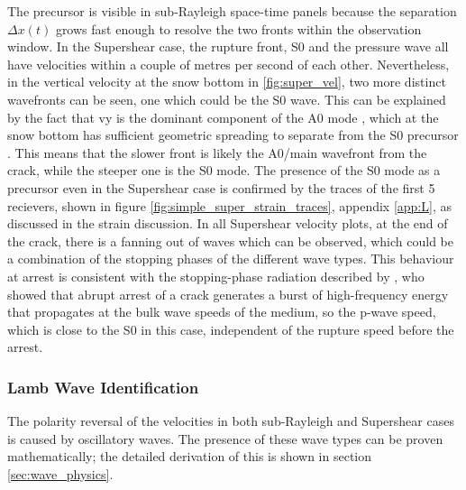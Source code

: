 The precursor is visible in sub-Rayleigh space-time panels because the separation $\Delta x(t)$ grows fast enough to resolve the two fronts within the observation window. In the Supershear case, the rupture front, S0 and the pressure wave all have velocities within a couple of metres per second of each other. Nevertheless, in the vertical velocity at the snow bottom in  \ref{fig:super_vel}, two more distinct wavefronts can be seen, one which could be the S0 wave. This can be explained by the fact that vy is the dominant component of the A0 mode \parencite{lambWavesElasticPlate1917}, which at the snow bottom has sufficient geometric spreading to separate from the S0 precursor \parencite{roseWavesPlates2014}. This means that the slower front is likely the A0/main wavefront from the crack, while the steeper one is the S0 mode. The presence of the S0 mode as a precursor even in the Supershear case is confirmed by the traces of the first 5 recievers, shown in figure \ref{fig:simple_super_strain_traces}, appendix \ref{app:L}, as discussed in the strain discussion. In all Supershear velocity plots, at the end of the crack, there is a fanning out of waves which can be observed, which could be a combination of the stopping phases of the different wave types. This behaviour at arrest is consistent with the stopping-phase radiation described by \textcite{madariagaHighfrequencyRadiationCrack1977}, who showed that abrupt arrest of a crack generates a burst of high-frequency energy that propagates at the bulk wave speeds of the medium, so the p-wave speed, which is close to the S0 in this case, independent of the rupture speed before the arrest. \par

\subsubsection{Lamb Wave Identification}

The polarity reversal of the velocities in both sub-Rayleigh and Supershear cases is caused by oscillatory waves. The presence of these wave types can be proven mathematically; the detailed derivation of this is shown in section \ref{sec:wave_physics}.
  
